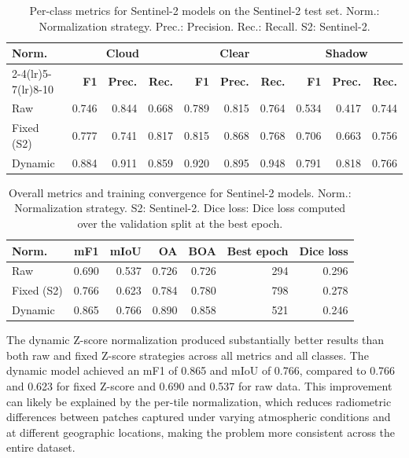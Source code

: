\begin{table}[H]
\centering
\caption[Per-class metrics for Sentinel-2 models on the Sentinel-2 test set.]{Per-class metrics for Sentinel-2 models on the Sentinel-2 test set. Norm.: Normalization strategy. Prec.: Precision. Rec.: Recall. S2: Sentinel-2.}
\label{tab:s2_perclass}
\small
\begin{tabular}{@{}lrrrrrrrrr@{}}
\toprule
\multirow{2}{*}{\textbf{Norm.}} & 
\multicolumn{3}{c}{\textbf{Cloud}} & 
\multicolumn{3}{c}{\textbf{Clear}} & 
\multicolumn{3}{c}{\textbf{Shadow}} \\
\cmidrule(lr){2-4}\cmidrule(lr){5-7}\cmidrule(lr){8-10}
& \textbf{F1} & \textbf{Prec.} & \textbf{Rec.} & 
\textbf{F1} & \textbf{Prec.} & \textbf{Rec.} &
\textbf{F1} & \textbf{Prec.} & \textbf{Rec.} \\
\midrule
Raw        & 0.746 & 0.844 & 0.668 & 0.789 & 0.815 & 0.764 & 0.534 & 0.417 & 0.744 \\
Fixed (S2) & 0.777 & 0.741 & 0.817 & 0.815 & 0.868 & 0.768 & 0.706 & 0.663 & 0.756 \\
Dynamic    & 0.884 & 0.911 & 0.859 & 0.920 & 0.895 & 0.948 & 0.791 & 0.818 & 0.766 \\
\bottomrule
\end{tabular}
\end{table}

\begin{table}[H]
\centering
\caption[Overall metrics and training convergence for Sentinel-2 models.]{Overall metrics and training convergence for Sentinel-2 models. Norm.: Normalization strategy. S2: Sentinel-2. Dice loss: Dice loss computed over the validation split at the best epoch.}
\label{tab:s2_overall}
\small
\begin{tabular}{lrrrrrr}
\toprule
\textbf{Norm.} & \textbf{mF1} & \textbf{mIoU} & 
\textbf{OA} & \textbf{BOA} & 
\textbf{Best epoch} & \textbf{Dice loss} \\
\midrule
Raw        & 0.690 & 0.537 & 0.726 & 0.726 & 294  & 0.296 \\
Fixed (S2) & 0.766 & 0.623 & 0.784 & 0.780 & 798  & 0.278 \\
Dynamic    & 0.865 & 0.766 & 0.890 & 0.858 & 521  & 0.246 \\
\bottomrule
\end{tabular}
\end{table}

The dynamic Z-score normalization produced substantially better results than both raw and fixed Z-score strategies across all metrics and all classes. The dynamic model achieved an mF1 of 0.865 and mIoU of 0.766, compared to 0.766 and 0.623 for fixed Z-score and 0.690 and 0.537 for raw data. This improvement can likely be explained by the per-tile normalization, which reduces radiometric differences between patches captured under varying atmospheric conditions and at different geographic locations, making the problem more consistent across the entire dataset.

